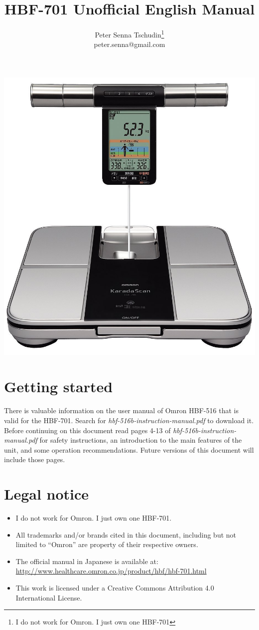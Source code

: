 \documentclass[10pt]{article}
\title{HBF-701 Unofficial English Manual}
\author{Peter Senna Tschudin\footnote{I do not work for Omron. I just own one
HBF-701}\\ {\small peter.senna@gmail.com}}
\begin{document}
\maketitle
\begin{center}
\vspace{15pt}
\includegraphics[width=0.8\linewidth]{images/hbf701.jpg}
\end{center}
\section{Getting started}
\label{sec:starting}
There is valuable information on the user manual of Omron HBF-516 that is valid
for the HBF-701. Search for \textit{hbf-516b-instruction-manual.pdf} to download
it. Before continuing on this document read pages 4-13 of
\textit{hbf-516b-instruction-manual.pdf} for safety instructions, an
introduction to the main features of the unit, and some operation
recommendations. Future versions of this document will include those pages.

\section{Legal notice}
\label{sec:legal}
\begin{itemize}
  \item I do not work for Omron. I just own one HBF-701.
  \item All trademarks and/or brands cited in this document, including but not
        limited to ``Omron'' are property of their respective owners.
  \item The official manual in Japanese is available at:
        \url{http://www.healthcare.omron.co.jp/product/hbf/hbf-701.html}
  \item This work is licensed under a Creative Commons Attribution 4.0
        International License.
\end{itemize}
\end{document}
